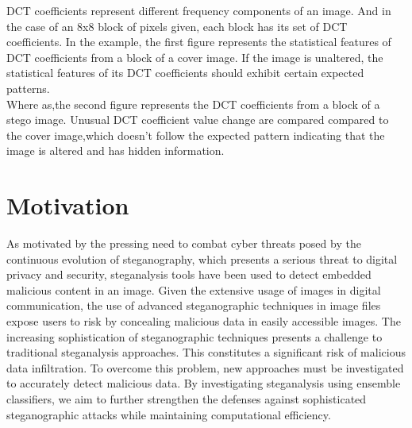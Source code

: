 DCT coefficients represent different frequency components of an image. And in the case of an 8x8 block of pixels given, each block has its set of DCT coefficients. In the example, the first figure represents the statistical features of DCT coefficients from a block of a cover image. If the image is unaltered, the statistical features of its DCT coefficients should exhibit certain expected patterns.\\
Where as,the second figure represents the DCT coefficients from a block of a stego image. Unusual DCT coefficient value change are compared compared to the cover image,which  doesn’t follow the expected pattern indicating that the image is altered and has hidden information.
\section{Motivation}
As motivated by the pressing need to combat cyber threats posed by the continuous evolution of steganography, which presents a serious threat to digital privacy and security, steganalysis tools have been used to detect embedded malicious content in an image. Given the extensive usage of images in digital communication, the use of advanced steganographic techniques in image files expose users to risk by concealing malicious data in easily accessible images. The increasing sophistication of steganographic techniques presents a challenge to traditional steganalysis approaches. This constitutes a significant risk of malicious data infiltration. To overcome this problem, new approaches must be investigated to accurately detect malicious data. By investigating steganalysis using ensemble classifiers, we aim to further strengthen the defenses against sophisticated steganographic attacks while maintaining computational efficiency.\\
\clearpage
